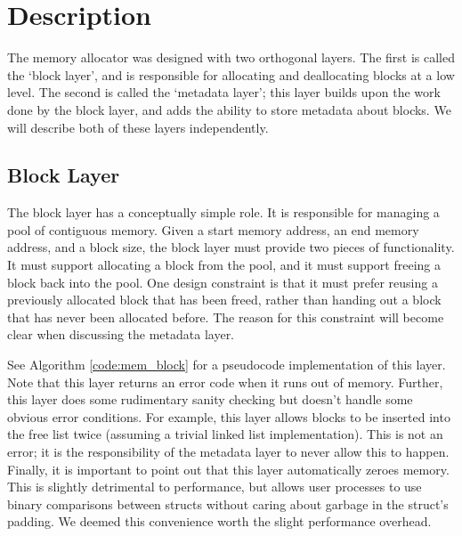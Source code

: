 \documentclass[12pt]{report}
\begin{document}
\section{Description}
    The memory allocator was designed with two orthogonal layers. The first is
    called the `block layer', and is responsible for allocating and deallocating
    blocks at a low level. The second is called the `metadata layer'; this layer
    builds upon the work done by the block layer, and adds the ability to store
    metadata about blocks. We will describe both of these layers independently.

\subsection{Block Layer}
    The block layer has a conceptually simple role. It is responsible for
    managing a pool of contiguous memory. Given a start memory address, an
    end memory address, and a block size, the block
    layer must provide two pieces of functionality. It must support allocating
    a block from the pool, and it must support freeing a block back into the
    pool. One design constraint is that it must prefer reusing a previously
    allocated block that has been freed, rather than handing out a block that
    has never been allocated before. The reason for this constraint will
    become clear when discussing the metadata layer.

    See Algorithm \ref{code:mem_block} for a pseudocode implementation of this
    layer. Note that this layer returns an error code when it runs out of
    memory. Further, this layer does some rudimentary sanity checking but
    doesn't handle some obvious error conditions. For example, this layer allows
    blocks to be inserted into the free list twice (assuming a trivial linked
    list implementation). This is not an error; it is the responsibility of
    the metadata layer to never allow this to happen. Finally, it is important
    to point out that this layer automatically zeroes memory. This is slightly
    detrimental to performance, but allows user processes to use binary
    comparisons between structs without caring about garbage in the struct's
    padding. We deemed this convenience worth the slight performance overhead.
\end{document}
